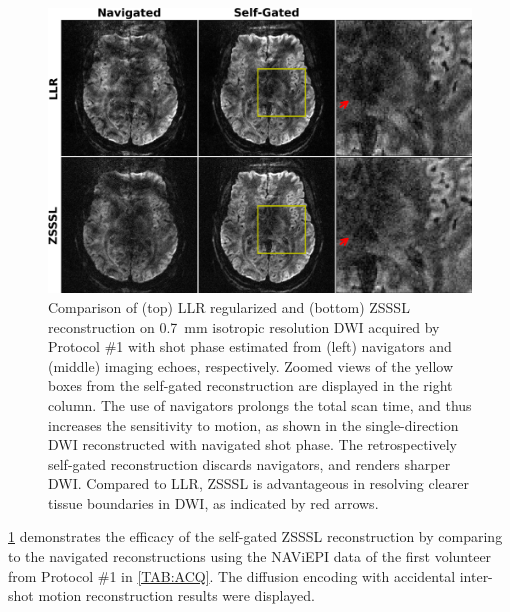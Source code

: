 \documentclass[journal,twoside,web]{ieeecolor}
\begin{document}
	\begin{figure}
		\begin{minipage}[c]{0.75\textwidth}
			\includegraphics[width=\textwidth]{../figures/fig2.png}
		\end{minipage}\hfill
		\begin{minipage}[c]{0.23\textwidth}
			\caption{Comparison of (top) LLR regularized and (bottom) ZSSSL
				reconstruction on 0.7~mm isotropic resolution DWI
				acquired by Protocol \#1
				with shot phase estimated from
				(left) navigators and (middle) imaging echoes, respectively.
				Zoomed views of the yellow boxes from the self-gated reconstruction
				are displayed in the right column.
				The use of navigators prolongs the total scan time,
				and thus increases the sensitivity to motion,
				as shown in the single-direction DWI reconstructed
				with navigated shot phase.
				The retrospectively self-gated reconstruction discards navigators,
				and renders sharper DWI. Compared to LLR, ZSSSL is advantageous
				in resolving clearer tissue boundaries in DWI,
				as indicated by red arrows.}
				\label{FIG:MOTION_RETRO_TRA}
		\end{minipage}
	\end{figure}

	\cref{FIG:MOTION_RETRO_TRA} demonstrates
	the efficacy of the self-gated ZSSSL reconstruction
	by comparing to the navigated reconstructions
	using the NAViEPI data of the first volunteer
	from Protocol \#1 in \cref{TAB:ACQ}.
	The diffusion encoding with accidental inter-shot motion
	reconstruction results were displayed.
\end{document}
